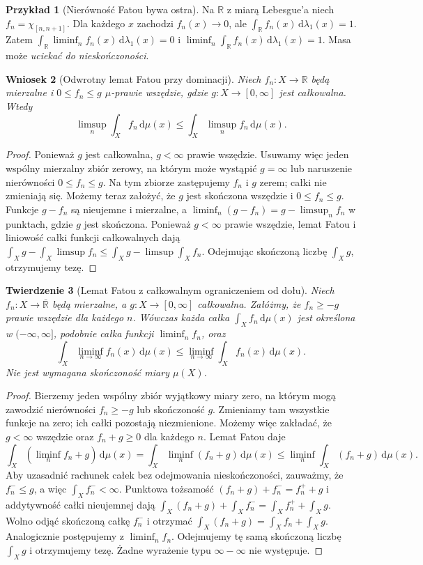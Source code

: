 \documentclass[11pt,a4paper,oneside]{book}
\numberwithin{equation}{chapter}
\theoremstyle{plain}
\newtheorem{twierdzenie}{Twierdzenie}[chapter]
\newtheorem{wniosek}[twierdzenie]{Wniosek}
\theoremstyle{definition}
\newtheorem{przyklad}[twierdzenie]{Przykład}
\theoremstyle{remark}
\begin{document}
\begin{przyklad}[Nierówność Fatou bywa ostra]
Na $\mathbb R$ z miarą Lebesgue'a niech
$f_n=\chi_{[n,n+1]}$. Dla każdego $x$ zachodzi
$f_n(x)\to0$, ale $\int_{\mathbb R} f_n(x)\,\mathrm d\lambda_1(x)=1$.
Zatem $\int_{\mathbb R}\liminf_nf_n(x)\,\mathrm d\lambda_1(x)=0$
i $\liminf_n\int_{\mathbb R} f_n(x)\,\mathrm d\lambda_1(x)=1$.
Masa może \emph{uciekać do nieskończoności}.
\end{przyklad}

\begin{wniosek}[Odwrotny lemat Fatou przy dominacji]
\label{cor:reverse-fatou}
Niech $f_n:X\to\mathbb R$ będą mierzalne i
$0\le f_n\le g$ $\mu$-prawie wszędzie, gdzie
$g:X\to[0,\infty]$ jest całkowalna. Wtedy
\[
\limsup_n\int_Xf_n\,\mathrm d\mu(x)
\le\int_X\limsup_nf_n\,\mathrm d\mu(x).
\]
\end{wniosek}
\begin{proof}
Ponieważ $g$ jest całkowalna, $g<\infty$ prawie
wszędzie. Usuwamy więc jeden wspólny mierzalny
zbiór zerowy, na którym może wystąpić $g=\infty$
lub naruszenie nierówności $0\le f_n\le g$.
Na tym zbiorze zastępujemy $f_n$ i $g$ zerem;
całki nie zmieniają się. Możemy teraz założyć,
że $g$ jest skończona wszędzie i $0\le f_n\le g$.
Funkcje $g-f_n$ są nieujemne i mierzalne, a
$\liminf_n(g-f_n)=g-\limsup_nf_n$ w punktach,
gdzie $g$ jest skończona. Ponieważ $g<\infty$
prawie wszędzie, lemat Fatou i liniowość całki
funkcji całkowalnych dają
$\int_X g-\int_X\limsup f_n\le
\int_X g-\limsup\int_X f_n$.
Odejmując skończoną liczbę $\int_X g$,
otrzymujemy tezę.
\end{proof}

\begin{twierdzenie}[Lemat Fatou z całkowalnym ograniczeniem od dołu]
\label{thm:fatou-integrable-lower-8}
Niech $f_n:X\to\overline{\mathbb R}$ będą mierzalne,
a $g:X\to[0,\infty]$ całkowalna. Załóżmy,
że $f_n\ge-g$ prawie wszędzie dla każdego $n$.
Wówczas każda całka $\int_Xf_n\,\mathrm d\mu(x)$
jest określona w $(-\infty,\infty]$, podobnie całka
funkcji $\liminf_nf_n$, oraz
\[
\int_X\liminf_{n\to\infty}f_n(x)\,\mathrm d\mu(x)
\le \liminf_{n\to\infty}\int_Xf_n(x)\,\mathrm d\mu(x).
\]
Nie jest wymagana skończoność miary $\mu(X)$.
\end{twierdzenie}
\begin{proof}
Bierzemy jeden wspólny zbiór wyjątkowy miary zero,
na którym mogą zawodzić nierówności $f_n\ge-g$
lub skończoność $g$. Zmieniamy tam wszystkie
funkcje na zero; ich całki pozostają niezmienione.
Możemy więc zakładać, że $g<\infty$ wszędzie oraz
$f_n+g\ge0$ dla każdego $n$. Lemat Fatou daje
\[
\int_X(\liminf_nf_n+g)\,\mathrm d\mu(x)
=\int_X\liminf_n(f_n+g)\,\mathrm d\mu(x)
\le\liminf_n\int_X(f_n+g)\,\mathrm d\mu(x).
\]
Aby uzasadnić rachunek całek bez odejmowania
nieskończoności, zauważmy, że $f_n^-\le g$,
a więc $\int_X f_n^-<\infty$. Punktowa tożsamość
$(f_n+g)+f_n^-=f_n^++g$ i addytywność całki
nieujemnej dają
$\int_X(f_n+g)+\int_Xf_n^-=
\int_Xf_n^++\int_Xg$.
Wolno odjąć skończoną całkę $f_n^-$ i otrzymać
$\int_X(f_n+g)=\int_Xf_n+\int_Xg$.
Analogicznie postępujemy z $\liminf_nf_n$.
Odejmujemy tę samą skończoną liczbę $\int_Xg$
i otrzymujemy tezę. Żadne wyrażenie typu
$\infty-\infty$ nie występuje.
\end{proof}
\end{document}
